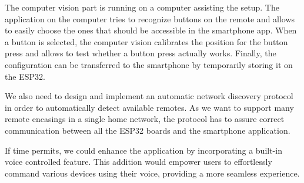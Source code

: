 The computer vision part is running on a computer assisting the setup. 
The application on the computer tries to recognize buttons on the remote and allows to easily choose the ones that should be accessible in the smartphone app.
When a button is selected, the computer vision calibrates the position for the button press and allows to test whether a button press actually works.
Finally, the configuration can be transferred to the smartphone by temporarily storing it on the ESP32.

We also need to design and implement an automatic network discovery protocol in order to automatically detect available remotes.
As we want to support many remote encasings in a single home network, the protocol has to assure correct communication between all the ESP32 boards and the smartphone application.

If time permits, we could enhance the application by incorporating a built-in voice controlled feature.
This addition would empower users to effortlessly command various devices using their voice, providing a more seamless experience.
